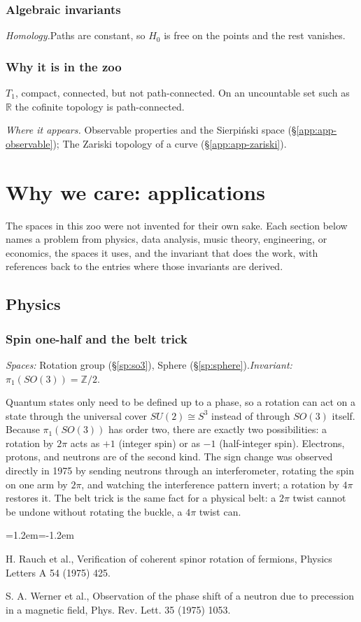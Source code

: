 \documentclass[11pt,twoside]{book}
\newcommand{\pt}[1]{\par\smallskip\noindent\textit{#1.}\enspace}
\begin{document}
\subsection*{Algebraic invariants}
\pt{Homology}Paths are constant, so $H_0$ is free on the points and the rest vanishes.
\subsection*{Why it is in the zoo}$T_1$, compact, connected, but not path-connected. On an uncountable set such as $\mathbb{R}$ the cofinite topology is path-connected.
\pt{Where it appears} Observable properties and the Sierpiński space (\S\ref{app:app-observable}); The Zariski topology of a curve (\S\ref{app:app-zariski}).
\bigskip
\chapter{Why we care: applications}
The spaces in this zoo were not invented for their own sake. Each section below names a problem from physics, data analysis, music theory, engineering, or economics, the spaces it uses, and the invariant that does the work, with references back to the entries where those invariants are derived.
\section{Physics}
\subsection{Spin one-half and the belt trick}\label{app:app-spin}
\noindent\textit{Spaces:} Rotation group (\S\ref{sp:so3}), Sphere (\S\ref{sp:sphere}).\enspace\textit{Invariant:} $\pi_1(SO(3))=\mathbb{Z}/2$.

Quantum states only need to be defined up to a phase, so a rotation can act on a state through the universal cover $SU(2)\cong S^3$ instead of through $SO(3)$ itself. Because $\pi_1(SO(3))$ has order two, there are exactly two possibilities: a rotation by $2\pi$ acts as $+1$ (integer spin) or as $-1$ (half-integer spin). Electrons, protons, and neutrons are of the second kind. The sign change was observed directly in 1975 by sending neutrons through an interferometer, rotating the spin on one arm by $2\pi$, and watching the interference pattern invert; a rotation by $4\pi$ restores it. The belt trick is the same fact for a physical belt: a $2\pi$ twist cannot be undone without rotating the buckle, a $4\pi$ twist can.
\begin{list}{}{\leftmargin=1.2em\itemindent=-1.2em\itemsep=0pt}\small \item H. Rauch et al., Verification of coherent spinor rotation of fermions, Physics Letters A 54 (1975) 425.\item S. A. Werner et al., Observation of the phase shift of a neutron due to precession in a magnetic field, Phys. Rev. Lett. 35 (1975) 1053.\end{list}
\end{document}
